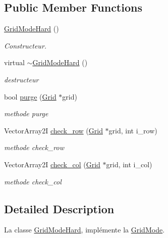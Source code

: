 \subsection*{Public Member Functions}
\begin{DoxyCompactItemize}
\item 
\hyperlink{classGridModeHard_a8a91a3b55990849271b8329c6a80b6a1}{Grid\-Mode\-Hard} ()
\begin{DoxyCompactList}\small\item\em Constructeur. \end{DoxyCompactList}\item 
virtual \hyperlink{classGridModeHard_a99545db48decac0df3afcc02e5877b80}{$\sim$\-Grid\-Mode\-Hard} ()
\begin{DoxyCompactList}\small\item\em destructeur \end{DoxyCompactList}\item 
\hypertarget{classGridModeHard_a418d223c2d8e6d5af77b0bbf4c10f0e8}{bool \hyperlink{classGridModeHard_a418d223c2d8e6d5af77b0bbf4c10f0e8}{purge} (\hyperlink{classGrid}{Grid} $\ast$grid)}\label{classGridModeHard_a418d223c2d8e6d5af77b0bbf4c10f0e8}

\begin{DoxyCompactList}\small\item\em methode purge \end{DoxyCompactList}\item 
Vector\-Array2\-I \hyperlink{classGridModeHard_a9293e31f44a67ed00f24f86675368409}{check\-\_\-row} (\hyperlink{classGrid}{Grid} $\ast$grid, int i\-\_\-row)
\begin{DoxyCompactList}\small\item\em methode check\-\_\-row \end{DoxyCompactList}\item 
Vector\-Array2\-I \hyperlink{classGridModeHard_a43cc62651628b27238c653ea244c4129}{check\-\_\-col} (\hyperlink{classGrid}{Grid} $\ast$grid, int i\-\_\-col)
\begin{DoxyCompactList}\small\item\em methode check\-\_\-col \end{DoxyCompactList}\end{DoxyCompactItemize}


\subsection{Detailed Description}
La classe \hyperlink{classGridModeHard}{Grid\-Mode\-Hard}, implémente la \hyperlink{classGridMode}{Grid\-Mode}. 

